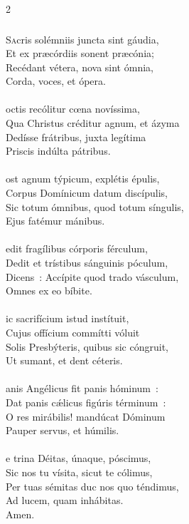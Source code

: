 \documentclass[9pt,twoside]{extarticle}
\begin{document}
\begin{multicols}{2}
{{\subsubsection*{\center{}}
\lettrine{S}acris solémniis juncta sint gáudia,\\ Et ex præcórdiis sonent præcónia;\\ Recédant vétera, nova sint ómnia,\\ Corda, voces, et ópera.\\
\\
octis recólitur cœna novíssima,\\ Qua Christus créditur agnum, et ázyma\\ Dedísse frátribus, juxta legítima\\ Priscis indúlta pátribus.\\
\\
ost agnum týpicum, explétis épulis,\\ Corpus Domínicum datum discípulis,\\ Sic totum ómnibus, quod totum síngulis,\\ Ejus fatémur mánibus.\\
\\
edit fragílibus córporis férculum,\\ Dedit et trístibus sánguinis póculum,\\ Dicens~: Accípite quod trado vásculum,\\ Omnes ex eo bíbite.\\
\\
ic sacrifícium istud instítuit,\\ Cujus offícium commítti vóluit\\ Solis Presbýteris, quibus sic cóngruit,\\ Ut sumant, et dent céteris.\\
\\
anis Angélicus fit panis hóminum~:\\ Dat panis cǽlicus figúris términum~:\\ O res mirábilis! mandúcat Dóminum\\ Pauper servus, et húmilis.\\
\\
e trina Déitas, únaque, póscimus,\\ Sic nos tu vísita, sicut te cólimus,\\ Per tuas sémitas duc nos quo téndimus,\\ Ad lucem, quam inhábitas.\\
Amen.
}}
\end{multicols}
\end{document}
